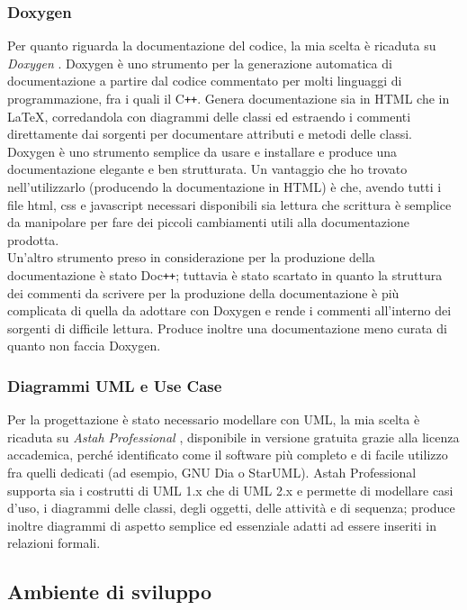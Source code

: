         \subsubsection{Doxygen}
        Per quanto riguarda la documentazione del codice, la mia scelta è ricaduta su \textit{Doxygen} \cite{site:doxygen}. Doxygen è uno strumento per la generazione automatica di documentazione a partire dal codice commentato per molti linguaggi di programmazione, fra i quali il C\texttt{++}. Genera documentazione sia in HTML che in \LaTeX, corredandola con diagrammi delle classi ed estraendo i commenti direttamente dai sorgenti per documentare attributi e metodi delle classi.\\ Doxygen è uno strumento semplice da usare e installare e produce una documentazione elegante e ben strutturata. Un vantaggio che ho trovato nell'utilizzarlo (producendo la documentazione in HTML) è che, avendo tutti i file html, css e javascript necessari disponibili sia lettura che scrittura è semplice da manipolare per fare dei piccoli cambiamenti utili alla documentazione prodotta. \\
        Un'altro strumento preso in considerazione per la produzione della documentazione è stato Doc\texttt{++}; tuttavia è stato scartato in quanto la struttura dei commenti da scrivere per la produzione della documentazione è più complicata di quella da adottare con Doxygen e rende i commenti all'interno dei sorgenti di difficile lettura. Produce inoltre una documentazione meno curata di quanto non faccia Doxygen.
        \subsubsection{Diagrammi UML e Use Case}
        Per la progettazione è stato necessario modellare con UML, la mia scelta è ricaduta su \textit{Astah Professional} \cite{site:astah}, disponibile in versione gratuita grazie alla licenza accademica, perché identificato come il software più completo e di facile utilizzo fra quelli dedicati (ad esempio, GNU Dia o StarUML). Astah Professional supporta sia i costrutti di UML 1.x che di UML 2.x e permette di modellare casi d'uso, i diagrammi delle classi, degli oggetti, delle attività e di sequenza; produce inoltre diagrammi di aspetto semplice ed essenziale adatti ad essere inseriti in relazioni formali.

    \subsection{Ambiente di sviluppo}


